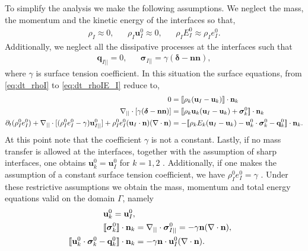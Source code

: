 To simplify the analysis we make the following assumptions. We neglect the mass, the momentum and the kinetic energy of the interfaces so that,
\begin{align*}
    \rho_I \approx 0,
    &&
    \rho_I \textbf{u}_I^0 \approx 0,
    &&
    \rho_I E_I^0 \approx \rho_I e_I^0. 
\end{align*}
Additionally, we neglect all the dissipative processes at the interfaces such that
\begin{align*}
    \textbf{q}_{I||} = 0,
    &&
    \bm\sigma_{I||} = \gamma (\bm\delta  - \textbf{nn}),
\end{align*}
where $\gamma$ is surface tension coefficient. 
In this situation the surface equations, from \ref{eq:dt_rhoI} to \ref{eq:dt_rhoIE_I} reduce to, 
\begin{align}
    0&= 
    \llbracket 
        \rho_k (\textbf{u}_I - \textbf{u}_k)
     \rrbracket \cdot \textbf{n}_k
    \\
    \mathbf{\nabla}_{||}\cdot [\gamma ( \bm\delta - \textbf{nn})]
    &= 
    \llbracket 
        \rho_k \textbf{u}_k (\textbf{u}_I - \textbf{u}_k)
        + \bm\sigma^0_k
     \rrbracket \cdot \textbf{n}_k
    \\
    \partial_t (\rho_I^0e_I^0)  
    + \mathbf{\nabla}_{||}\cdot [
        (\rho_I^0 e_I^0 - \gamma)
         \textbf{u}_{I||}^0
        ]
    + \rho_I^0e_I^0  (\textbf{u}_I \cdot \textbf{n})(\mathbf{\nabla}\cdot \textbf{n})
    &= 
    -\llbracket 
        \rho_k E_k (\textbf{u}_I - \textbf{u}_k)
        - \textbf{u}_k^0 \cdot \bm{\sigma}_k^0 - \textbf{q}_k^0
     \rrbracket \cdot \textbf{n}_k. 
\end{align} 
At this point note that the coefficient $\gamma$ is not a constant. 
Lastly, if no mass transfer is allowed at the interfaces, together with the assumption of sharp interfaces, one obtains $\textbf{u}_k^0 = \textbf{u}_I^0$ for $k = 1,2$ \citep[chapter 2]{tryggvason2011direct}. 
Additionally, if one makes the assumption of a constant surface tension coefficient, we have $\rho_I^0 e_I^0 = \gamma$ \citep{ishii2010thermo}.  
Under these restrictive assumptions we obtain the mass, momentum and total energy equations valid on the domain $\Gamma$, namely
\begin{align}
    \label{eq:dt_rho_I}
    \textbf{u}_k^0 = \textbf{u}_I^0, \\
    \llbracket \bm{\sigma}_k^0 \rrbracket \cdot \textbf{n}_k 
    &=
    \mathbf{\nabla}_{||}\cdot\bm\sigma^0_{I||}
    =
    -\gamma\textbf{n}(\mathbf{\nabla}\cdot \textbf{n}),
    \label{eq:surface_tension}\\
    \label{eq:dt_rhoI_EI}
    \llbracket \textbf{u}_k^0 \cdot \bm{\sigma}_k^0 - \textbf{q}_k^0 \rrbracket \cdot \textbf{n}_k
    &=
    -\gamma\textbf{n}\cdot \textbf{u}_{I}^0(\mathbf{\nabla}\cdot \textbf{n}).
\end{align}
